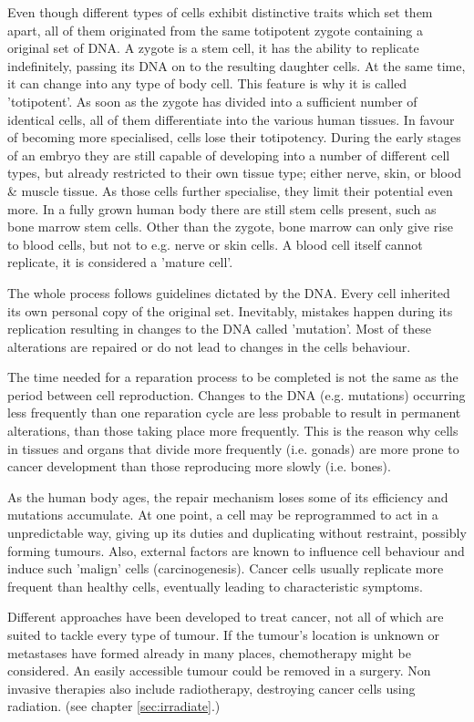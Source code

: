 Even though different types of cells exhibit distinctive traits which set them apart, all of them originated from the same totipotent zygote containing a original set of DNA.
A zygote is a stem cell, it has the ability to replicate indefinitely, passing its DNA on to the resulting daughter cells.
At the same time, it can change into any type of body cell. This feature is why it is called 'totipotent'.
As soon as the zygote has divided into a sufficient number of identical cells, all of them differentiate into the various human tissues.
In favour of becoming more specialised, cells lose their totipotency.
During the early stages of an embryo they are still capable of developing into a number of different cell types, but already restricted to their own tissue type; either nerve, skin, or blood \& muscle tissue.
As those cells further specialise, they limit their potential even more.
In a fully grown human body there are still stem cells present, such as bone marrow stem cells.
Other than the zygote, bone marrow can only give rise to blood cells, but not to e.g. nerve or skin cells.
A blood cell itself cannot replicate, it is considered a 'mature cell'.

The whole process follows guidelines dictated by the DNA.
Every cell inherited its own personal copy of the original set.
Inevitably, mistakes happen during its replication resulting in changes to the DNA called 'mutation'.
Most of these alterations are repaired or do not lead to changes in the cells behaviour.

The time needed for a reparation process to be completed is not the same as the period between cell reproduction. Changes to the DNA (e.g. mutations) occurring less frequently than one reparation cycle are less probable to result in permanent alterations, than those taking place more frequently. This is the reason why cells in tissues and organs that divide more frequently (i.e. gonads) are more prone to cancer development than those reproducing more slowly (i.e. bones).

As the human body ages, the repair mechanism loses some of its efficiency and mutations accumulate.
At one point, a cell may be reprogrammed to act in a unpredictable way, giving up its duties and duplicating without restraint, possibly forming tumours.
Also, external factors are known to influence cell behaviour and induce such 'malign' cells (carcinogenesis).
Cancer cells usually replicate more frequent than healthy cells, eventually leading to characteristic symptoms.

Different approaches have been developed to treat cancer, not all of which are suited to tackle every type of tumour.
If the tumour's location is unknown or metastases have formed already in many places, chemotherapy might be considered.
An easily accessible tumour could be removed in a surgery.
Non invasive therapies also include radiotherapy, destroying cancer cells using radiation. (see chapter \ref{sec:irradiate}.)

